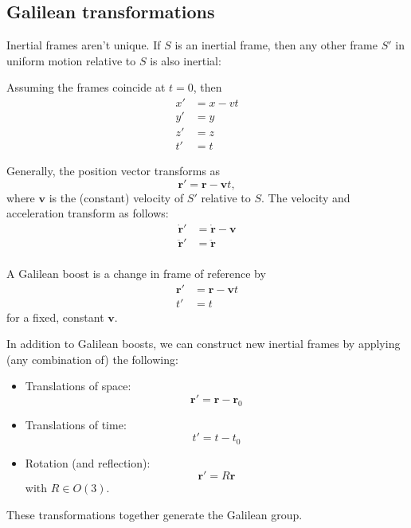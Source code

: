 \documentclass[a4paper]{article}
\begin{document}
\subsection{Galilean transformations}
Inertial frames aren't unique. If $S$ is an inertial frame, then any other frame $S'$ in uniform motion relative to $S$ is also inertial:
\begin{center}
\end{center}

Assuming the frames coincide at $t = 0$, then
\begin{align*}
  x' &= x - vt\\
  y' &= y\\
  z' &= z\\
  t' &= t
\end{align*}

Generally, the position vector transforms as
\[
  \mathbf{r}' = \mathbf{r} - \mathbf{v}t,
\]
where $\mathbf{v}$ is the (constant) velocity of $S'$ relative to $S$. The velocity and acceleration transform as follows:
\begin{align*}
  \dot{\mathbf{r}}' &= \dot{\mathbf{r}} - \mathbf{v}\\
  \ddot{\mathbf{r}}' &= \ddot{\mathbf{r}}\\
\end{align*}
\begin{defi}
  A Galilean boost is a change in frame of reference by
  \begin{align*}
    \mathbf{r}' &= \mathbf{r} - \mathbf{v}t\\
    t' &= t
  \end{align*}
  for a fixed, constant $\mathbf{v}$.
\end{defi}

In addition to Galilean boosts, we can construct new inertial frames by applying (any combination of) the following:
\begin{itemize}
  \item Translations of space:
    \[
      \mathbf{r}' = \mathbf{r} - \mathbf{r}_0
    \]
  \item Translations of time:
    \[
      t' = t - t_0
    \]
  \item Rotation (and reflection):
    \[
      \mathbf{r}' = R\mathbf{r}
    \]
    with $R\in O(3)$.
\end{itemize}
These transformations together generate the Galilean group.
\end{document}

